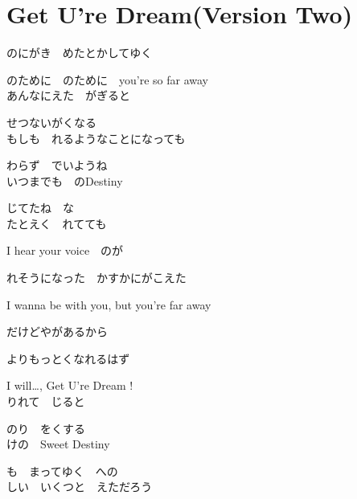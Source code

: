 \section{ Get U're Dream(Version Two)}
\large{

のにがき　めたとかしてゆく

のために　のために　you're so far away
\\

あんなにえた　がぎると

せつないがくなる
\\

もしも　れるようなことになっても

わらず　でいようね
\\

いつまでも　のDestiny

じてたね　な
\\

たとえく　れてても

I hear your voice　のが

れそうになった　かすかにがこえた

I wanna be with you, but you're far away

だけどやがあるから

よりもっとくなれるはず

I will…, Get U're Dream !
\\

りれて　じると

のり　をくする
\\

けの　Sweet Destiny

も　まってゆく　への
\\

しい　いくつと　えただろう

}
